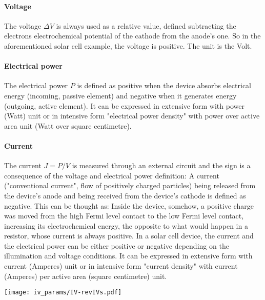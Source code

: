 		\paragraph{Voltage} The voltage $\Delta V$ is always used as a relative value, defined subtracting the electrons electrochemical potential of the cathode from the anode's one. So in the aforementioned solar cell example, the voltage is positive. The unit is the Volt.

		\paragraph{Electrical power} The electrical power $P$ is defined as positive when the device absorbs electrical energy (incoming, passive element) and negative when it generates energy (outgoing, active element). It can be expressed in extensive form with power (Watt) unit or in intensive form "electrical power density" with power over active area unit (Watt over square centimetre).

		\paragraph{Current} The current $J=P/V$ is measured through an external circuit and the sign is a consequence of the voltage and electrical power definition: A current ("conventional current", flow of positively charged particles) being released from the device's anode and being received from the device's cathode is defined as negative. This can be thought as: Inside the device, somehow, a positive charge was moved from the high Fermi level contact to the low Fermi level contact, increasing its electrochemical energy, the opposite to what would happen in a resistor, whose current is always positive. In a solar cell device, the current and the electrical power can be either positive or negative depending on the illumination and voltage conditions. It can be expressed in extensive form with current (Amperes) unit or in intensive form "current density" with current (Amperes) per active area (square centimetre) unit.

		\begin{SCfigure}
			\centering
			\texttt{[image: iv\_params/IV-revIVs.pdf]}
			\label{fig:iv_params}
		\end{SCfigure}

